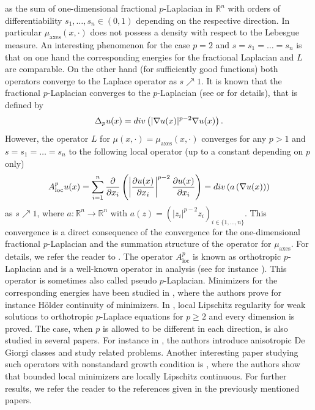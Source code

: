 \documentclass[11pt]{amsart}
\theoremstyle{plain}
\theoremstyle{definition}
\numberwithin{equation}{section}
\newcommand{\R}{\mathbb{R}}
\newcommand{\ma}{\mu_{\mathrm{axes}}}
\renewcommand{\div}{\textnormal{div}}
\begin{document}
as the sum of one-dimensional fractional $p$-Laplacian in $\R^n$ with orders of differentiability $s_1,\dots,s_n\in(0,1)$ depending on the respective direction.
In particular $\ma(x,\cdot)$ does not possess a density with respect to the Lebesgue measure.
An interesting phenomenon for the case $p=2$ and $s=s_1=\dots=s_n$ is that on one hand the corresponding energies for the fractional Laplacian and $L$ are comparable. On the other hand (for sufficiently good functions) both operators converge to the Laplace operator as $s\nearrow 1$. It is known that the fractional $p$-Laplacian converges to the $p$-Laplacian (see \cite[Theorem 2.8]{BucSqu21} or \cite[Lemma 5.1]{dTGCV20} for details), that is  defined by
\[ \Delta_pu(x) = \div\left(|\nabla u(x)|^{p-2}\nabla u(x)\right). \]
However, the operator $L$ for $\mu(x,\cdot)=\ma(x,\cdot)$ converges for any $p>1$ and $s=s_1=\dots=s_n$ to the following local operator (up to a constant depending on $p$ only)
\begin{equation} \label{eq:Aploc}
  A_{\text{loc}}^pu(x)=\sum_{i=1}^n \frac{\partial}{\partial x_i} \left(\left|\frac{\partial u(x)}{\partial x_i}\right|^{p-2}\frac{\partial u(x)}{\partial x_i}\right) = \div\left(a\left(\nabla u(x)\right)\right)
\end{equation}
 as $s\nearrow 1$, where $a:\R^n\to\R^n$ with $a(z) = (|z_i|^{p-2}z_i)_{i\in\{1,\dots,n\}}$. This convergence is a direct consequence of the convergence for the one-dimensional fractional $p$-Laplacian and the summation structure of the operator for $\ma$. For details, we refer the reader to .
The operator $A_{\text{loc}}^p$ is known as orthotropic $p$-Laplacian and is a well-known operator in analysis (see for instance \cite[Chapter 1, Section 8]{Lions69}). This operator is sometimes also called pseudo $p$-Laplacian.
Minimizers for the corresponding energies have been studied in \cite{BEKA04}, where the authors prove for instance H\"older continuity of minimizers. In \cite{BBLV18},  local Lipschitz regularity for weak solutions to orthotropic $p$-Laplace equations for $p\geq 2$ and every dimension is proved. The case, when $p$ is allowed to be different in each direction, is also studied in several papers.
For instance in \cite{PalaPseudo}, the authors introduce anisotropic De Giorgi classes and study related problems. Another interesting paper studying such operators with nonstandard growth condition is \cite{BB20}, where the authors show that bounded local minimizers are locally Lipschitz continuous. For further results, we refer the reader to the references given in the previously mentioned papers.
\end{document}

